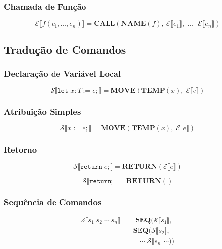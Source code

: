 \subsubsection*{Chamada de Função}

\[
  \mathcal{E}\llbracket f(e_1, \ldots, e_n) \rrbracket =
  \mathbf{CALL}\!\left(\mathbf{NAME}(f),\;
    \mathcal{E}\llbracket e_1 \rrbracket,\; \ldots,\;
  \mathcal{E}\llbracket e_n \rrbracket\right)
\]

\subsection{Tradução de Comandos}\label{sec:sdt-stmt}

\subsubsection*{Declaração de Variável Local}

\[
  \mathcal{S}\llbracket \mathtt{let}\; x : T := e \mathtt{;} \rrbracket =
  \mathbf{MOVE}(\mathbf{TEMP}(x),\; \mathcal{E}\llbracket e \rrbracket)
\]

\subsubsection*{Atribuição Simples}

\[
  \mathcal{S}\llbracket x := e \mathtt{;} \rrbracket =
  \mathbf{MOVE}(\mathbf{TEMP}(x),\; \mathcal{E}\llbracket e \rrbracket)
\]

\subsubsection*{Retorno}

\[
  \mathcal{S}\llbracket \mathtt{return}\; e \mathtt{;} \rrbracket =
  \mathbf{RETURN}(\mathcal{E}\llbracket e \rrbracket)
\]

\[
  \mathcal{S}\llbracket \mathtt{return} \mathtt{;} \rrbracket =
  \mathbf{RETURN}()
\]

\subsubsection*{Sequência de Comandos}

\[
  \begin{aligned}
    \mathcal{S}\llbracket s_1\; s_2\; \cdots\; s_n \rrbracket
    &= \mathbf{SEQ}(\mathcal{S}\llbracket s_1 \rrbracket, \\
      &\quad \mathbf{SEQ}(\mathcal{S}\llbracket s_2 \rrbracket, \\
    &\qquad \cdots\; \mathcal{S}\llbracket s_n \rrbracket \cdots))
  \end{aligned}
\]

